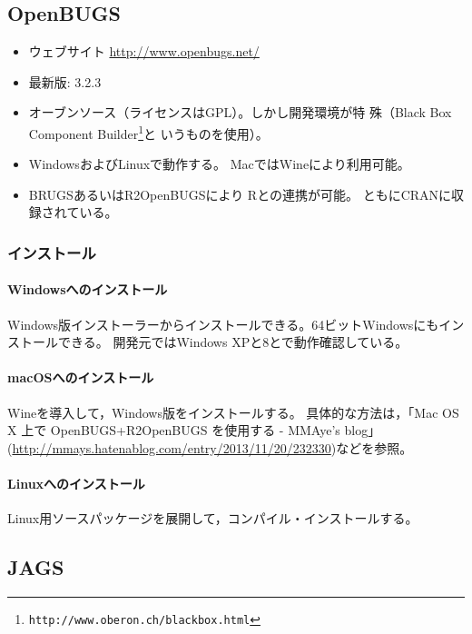 \documentclass[11pt,uplatex]{jsarticle}
\begin{document}
\subsection{OpenBUGS}

\begin{itemize}
\item ウェブサイト \url{http://www.openbugs.net/}
\item 最新版: 3.2.3
\item オーブンソース（ライセンスはGPL）。しかし開発環境が特
  殊（Black Box Component Builder\footnote{\texttt{http://www.oberon.ch/blackbox.html}}と
  いうものを使用）。
\item WindowsおよびLinuxで動作する。
Macでは\textsf{Wine}により利用可能。
\item \textsf{BRUGS}あるいは\textsf{R2OpenBUGS}により
\textsf{R}との連携が可能\cite{Thomas}。
ともにCRANに収録されている。
\end{itemize}

\subsubsection*{インストール}
\paragraph{Windowsへのインストール}
Windows版インストーラーからインストールできる。64ビットWindowsにもインストールできる。
開発元ではWindows XPと8とで動作確認している。

\paragraph{macOSへのインストール}
\textsf{Wine}を導入して，Windows版をインストールする。
具体的な方法は，「Mac OS X 上で OpenBUGS+R2OpenBUGS を使用する - MMAye's blog」(\url{http://mmays.hatenablog.com/entry/2013/11/20/232330})などを参照。

\paragraph{Linuxへのインストール}
Linux用ソースパッケージを展開して，コンパイル・インストールする。

\subsection{JAGS}
\end{document}
